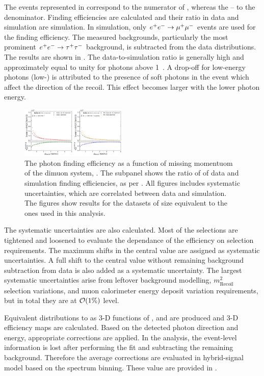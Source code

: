 The events represented in  correspond to the numerator of , whereas the  -- to the denominator.
Finding efficiencies are calculated and their ratio in data and simulation are simulation.
In simulation, only $e^+e^-\rightarrow\mu^+\mu^-$ events are used for the finding efficiency.
The measured backgrounds, particularly the most prominent $e^+e^-\rightarrow\tau^+\tau^-$ background, is subtracted from the data distributions.
The results are shown in .
The data-to-simulation ratio is generally high and approximately equal to unity for photons above 1~\gev.
A drop-off for low-energy photons (low-\pRecoil) is attributed to the presence of soft \ISR photons in the event which affect the direction of the recoil.
This effect becomes larger with the lower photon energy.
\begin{figure}[htbp!]
    \centering
    \includegraphics[width=0.45\textwidth,page=2]{figures/data_sim_corrections/pyth_data_mc_agreement_pRecoil.pdf}
    \caption{\label{fig:data_mc_photon_eff} The photon finding efficiency as a function of missing momentuom of the dimuon system, \pRecoil.
    The subpanel shows the ratio of of data and simulation finding efficiencies, as per .
    All figures includes systematic uncertainties, which are correlated between data and simulation.
    The figures show results for the datasets of size equivalent to the ones used in this analysis.
    }
\end{figure}

The systematic uncertainties are also calculated.
Most of the selections are tightened and loosened to evaluate the dependance of the efficiency on selection requirements.
The maximum shifts in the central value are assigned as systematic uncertainties.
A full shift to the central value without remaining background subtraction from data is also added as a systematic uncertainty.
The largest systematic uncertainties arise from leftover background modelling, $m^2_{\mathrm{Recoil}}$ selection variations, and muon calorimeter energy deposit variation requirements,
but in total they are at ${\cal O}(1\%)$ level.

Equivalent distributions to  as 3-D functions of \pRecoil, \pRecoilPhi and \pRecoilTheta are produced and 3-D efficiency maps are calculated.
Based on the detected photon direction and energy, appropriate corrections are applied.
In the \BtoXsgamma analysis, the event-level information is lost after performing the \Mbc fit and subtracting the remaining \BB background.
Therefore the average corrections are evaluated in \BtoXsgamma hybrid-signal model based on the \EB spectrum binning.
These value are provided in .

